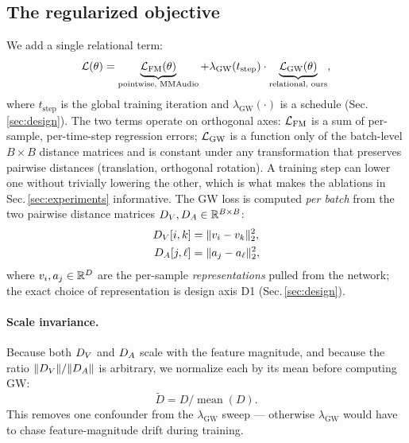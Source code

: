 \subsection{The regularized objective}
\label{sec:method:reg}
We add a single relational term:
\begin{equation}
\label{eq:total-loss}
  \mathcal{L}(\theta) = \underbrace{\mathcal{L}_{\mathrm{FM}}(\theta)}_{\text{pointwise, MMAudio}}
    + \lambda_{\mathrm{GW}}(t_{\text{step}}) \cdot
    \underbrace{\mathcal{L}_{\mathrm{GW}}(\theta)}_{\text{relational, ours}},
\end{equation}
where $t_{\text{step}}$ is the global training iteration and
$\lambda_{\mathrm{GW}}(\cdot)$ is a schedule (Sec.\,\ref{sec:design}).
The two terms operate on orthogonal axes: $\mathcal{L}_{\mathrm{FM}}$ is a sum of
per-sample, per-time-step regression errors; $\mathcal{L}_{\mathrm{GW}}$ is a function
only of the batch-level $B \times B$ distance matrices and is
constant under any transformation that preserves pairwise
distances (translation, orthogonal rotation). A training step can
lower one without trivially lowering the other, which is what
makes the ablations in Sec.\,\ref{sec:experiments} informative.
The GW loss is computed \emph{per batch} from the two pairwise
distance matrices $D_{V}, D_{A} \in \mathbb{R}^{B \times B}$:
\begin{align}
  D_{V}[i,k] &= \lVert v_i - v_k \rVert_2^2, \\
  D_{A}[j,\ell] &= \lVert a_j - a_\ell \rVert_2^2,
\end{align}
where $v_i, a_j \in \mathbb{R}^{D}$ are the per-sample
\emph{representations} pulled from the network; the exact choice
of representation is design axis D1 (Sec.\,\ref{sec:design}).

\paragraph{Scale invariance.}
Because both $D_{V}$ and $D_{A}$ scale with the feature magnitude, and
because the ratio $\lVert D_{V} \rVert / \lVert D_{A} \rVert$ is
arbitrary, we normalize each by its mean before computing GW:
\begin{equation}
  \tilde D = D / \operatorname{mean}(D).
\end{equation}
This removes one confounder from the $\lambda_{\mathrm{GW}}$
sweep --- otherwise $\lambda_{\mathrm{GW}}$ would have to chase
feature-magnitude drift during training.

